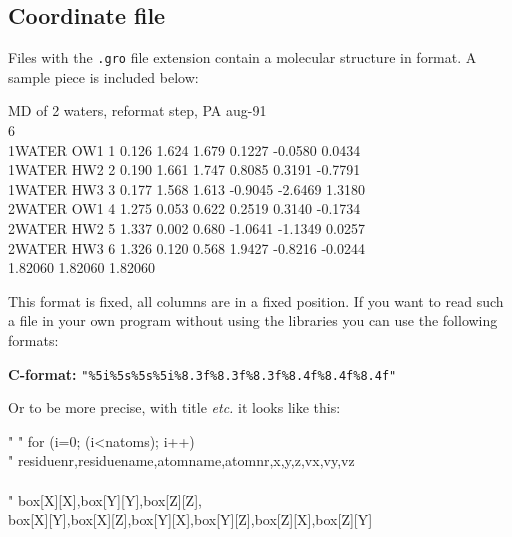 \subsection{Coordinate file}
\label{subsec:grofile}
Files with the {\tt .gro} file extension contain a molecular structure in 
 format. A sample piece is included below:

\begin{tt}
MD of 2 waters, reformat step, PA aug-91\\
    6\\
    1WATER  OW1    1   0.126   1.624   1.679  0.1227 -0.0580  0.0434\\
    1WATER  HW2    2   0.190   1.661   1.747  0.8085  0.3191 -0.7791\\
    1WATER  HW3    3   0.177   1.568   1.613 -0.9045 -2.6469  1.3180\\
    2WATER  OW1    4   1.275   0.053   0.622  0.2519  0.3140 -0.1734\\
    2WATER  HW2    5   1.337   0.002   0.680 -1.0641 -1.1349  0.0257\\
    2WATER  HW3    6   1.326   0.120   0.568  1.9427 -0.8216 -0.0244\\
   1.82060   1.82060   1.82060\\
\end{tt}

This format is fixed, {\ie} all columns are in a fixed position. If you
want to read such a file in your own program without using the
{\gromacs} libraries you can use the following formats:

{\bf C-format:} \verb'"%5i%5s%5s%5i%8.3f%8.3f%8.3f%8.4f%8.4f%8.4f"'

Or to be more precise, with title {\em etc.} it looks like this:

\begin{tt}
  "%
  "%
  for (i=0; (i<natoms); i++) {\\
    "%
      residuenr,residuename,atomname,atomnr,x,y,z,vx,vy,vz\\
  }\\
  "%
    box[X][X],box[Y][Y],box[Z][Z],\\
    box[X][Y],box[X][Z],box[Y][X],box[Y][Z],box[Z][X],box[Z][Y]\\
\end{tt}

